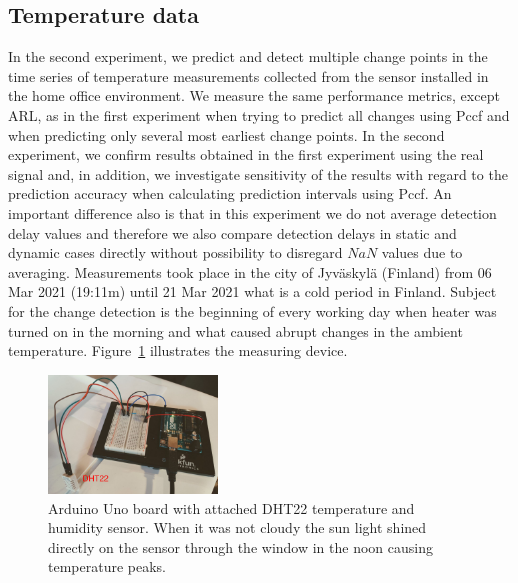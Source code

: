 \subsection{Temperature data}
In the second experiment, we predict and detect multiple change points in the time series of temperature measurements collected from the sensor installed in the home office environment.
We measure the same performance metrics, except ARL, as in the first experiment when trying to predict all changes using Pccf and when predicting only several most earliest change points.
In the second experiment, we confirm results obtained in the first experiment using the real signal and, in addition, we investigate sensitivity of the results with regard to the prediction accuracy when calculating prediction intervals using Pccf.
An important difference also is that in this experiment we do not average detection delay values and therefore we also compare detection delays in static and dynamic cases directly without possibility to disregard $NaN$ values due to averaging.
Measurements took place in the city of Jyv\"{a}skyl\"{a} (Finland) from 06 Mar 2021 (19:11m) until 21 Mar 2021 what is a cold period in Finland.
Subject for the change detection is the beginning of every working day when heater was turned on in the morning and what caused abrupt changes in the ambient temperature.
Figure~\ref{fig:dht22} illustrates the measuring device.
\begin{figure}[htb!]
	\centering
	\includegraphics[width=0.4\textwidth]{./pics/journal_paper/DHT22.png}
	\caption{
		Arduino Uno board with attached DHT22 temperature and humidity sensor.
		When it was not cloudy the sun light shined directly on the sensor through the window in the noon causing temperature peaks.
	}
	\label{fig:dht22}
\end{figure}
